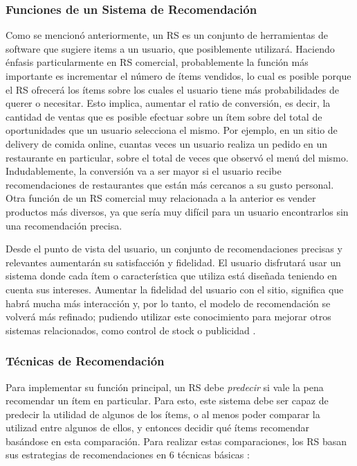 \subsubsection{Funciones de un Sistema de Recomendación}
Como se mencionó anteriormente, un RS es un conjunto de herramientas de software que sugiere items a un usuario, que posiblemente utilizará. Haciendo énfasis particularmente en RS comercial, probablemente la función más importante es incrementar el número de ítems vendidos, lo cual es posible porque el RS ofrecerá los ítems sobre los cuales el usuario tiene más probabilidades de querer o necesitar. Esto implica, aumentar el ratio de conversión, es decir, la cantidad de ventas que es posible efectuar sobre un ítem sobre del total de oportunidades que un usuario selecciona el mismo. Por ejemplo, en un sitio de delivery de comida online, cuantas veces un usuario realiza un pedido en un restaurante en particular, sobre el total de veces que observó el menú del mismo. Indudablemente, la conversión va a ser mayor si el usuario recibe recomendaciones de restaurantes que están más cercanos a su gusto personal. Otra función de un RS comercial muy relacionada a la anterior es vender productos más diversos, ya que sería muy difícil para un usuario encontrarlos sin una recomendación precisa. 

\bigskip Desde el punto de vista del usuario, un conjunto de recomendaciones precisas y relevantes aumentarán su satisfacción y fidelidad. El usuario disfrutará usar un sistema donde cada ítem o característica que utiliza está diseñada teniendo en cuenta sus intereses. Aumentar la fidelidad del usuario con el sitio, significa que habrá mucha más interacción y, por lo tanto, el modelo de recomendación se volverá más refinado; pudiendo utilizar este conocimiento para mejorar otros sistemas relacionados, como control de stock o publicidad \citep{ricci2011introduction}.

\subsubsection{Técnicas de Recomendación}
Para implementar su función principal, un RS debe \textit{predecir} si vale la pena recomendar un ítem en particular. Para esto, este sistema debe ser capaz de predecir la utilidad de algunos de los ítems, o al menos poder comparar la utilizad entre algunos de ellos, y entonces decidir qué ítems recomendar basándose en esta comparación. Para realizar estas comparaciones, los RS basan sus estrategias de recomendaciones en 6 técnicas básicas \citep{ricci2011introduction}:

